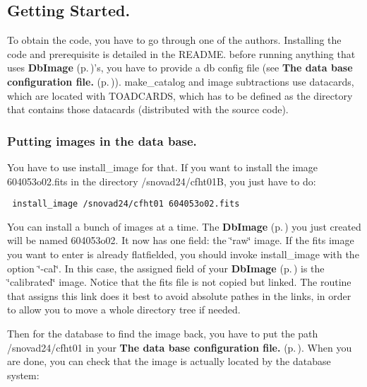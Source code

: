 \subsection{Getting Started.}\label{gettingstarted}


To obtain the code, you have to go through one of the authors. Installing the code and prerequisite is detailed in the README. before running anything that uses {\bf Db\-Image} {\rm (p.\,\pageref{class_dbimage})}'s, you have to provide a db config file (see {\bf The data base configuration file.} {\rm (p.\,\pageref{dbconfig})}). make\_\-catalog and image subtractions use datacards, which are located with TOADCARDS, which has to be defined as the directory that contains those datacards (distributed with the source code).

\subsubsection{Putting images in the data base.}\label{installing_images}
 You have to use install\_\-image for that. If you want to install the image 604053o02.fits in the directory /snovad24/cfht01B, you just have to do: \footnotesize\begin{verbatim} install_image /snovad24/cfht01 604053o02.fits\end{verbatim}\normalsize 
 You can install a bunch of images at a time. The {\bf Db\-Image} {\rm (p.\,\pageref{class_dbimage})} you just created will be named 604053o02. It now has one field: the \char`\"{}raw\char`\"{} image. If the fits image you want to enter is already flatfielded, you should invoke install\_\-image with the option \char`\"{}-cal\char`\"{}. In this case, the assigned field of your {\bf Db\-Image} {\rm (p.\,\pageref{class_dbimage})} is the \char`\"{}calibrated\char`\"{} image. Notice that the fits file is not copied but linked. The routine that assigns this link does it best to avoid absolute pathes in the links, in order to allow you to move a whole directory tree if needed.

Then for the database to find the image back, you have to put the path /snovad24/cfht01 in your {\bf The data base configuration file.} {\rm (p.\,\pageref{dbconfig})}. When you are done, you can check that the image is actually located by the database system:

